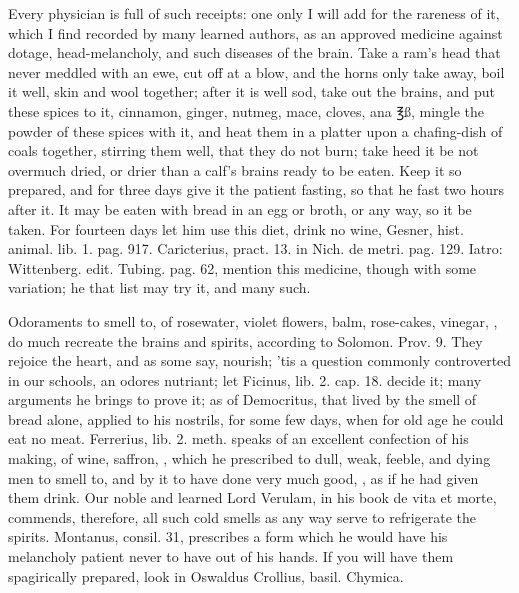 Every physician is full of such receipts: one only I will add for the
rareness of it, which I find recorded by many learned authors, as an
approved medicine against dotage, head-melancholy, and such diseases of
the brain. Take a ram's head that never meddled with an ewe, cut
off at a blow, and the horns only take away, boil it well, skin and
wool together; after it is well sod, take out the brains, and put these
spices to it, cinnamon, ginger, nutmeg, mace, cloves, ana ℥ß, mingle
the powder of these spices with it, and heat them in a platter upon a
chafing-dish of coals together, stirring them well, that they do not
burn; take heed it be not overmuch dried, or drier than a calf's brains
ready to be eaten. Keep it so prepared, and for three days give it the
patient fasting, so that he fast two hours after it. It may be eaten
with bread in an egg or broth, or any way, so it be taken. For fourteen
days let him use this diet, drink no wine, \etc{} Gesner, hist. animal.
lib. 1. pag. 917. Caricterius, pract. 13. in Nich. de metri. pag. 129.
Iatro: Wittenberg. edit. Tubing. pag. 62, mention this medicine, though
with some variation; he that list may try it, and many such.

Odoraments to smell to, of rosewater, violet flowers, balm, rose-cakes,
vinegar, \etc{}, do much recreate the brains and spirits, according to
Solomon. Prov.  9. They rejoice the heart, and as some say,
nourish; 'tis a question commonly controverted in our schools, an
odores nutriant; let Ficinus, lib. 2. cap. 18. decide it; many
arguments he brings to prove it; as of Democritus, that lived by the
smell of bread alone, applied to his nostrils, for some few days, when
for old age he could eat no meat. Ferrerius, lib. 2. meth. speaks of an
excellent confection of his making, of wine, saffron, \etc{}, which he
prescribed to dull, weak, feeble, and dying men to smell to, and by it
to have done very much good, , as
if he had given them drink. Our noble and learned Lord Verulam,
in his book \textlatin{de vita et morte}, commends, therefore, all such cold smells
as any way serve to refrigerate the spirits. \textlatin{Montanus, consil. 31},
prescribes a form which he would have his melancholy patient never to
have out of his hands. If you will have them spagirically prepared,
look in \textlatin{Oswaldus Crollius, basil. Chymica}.

